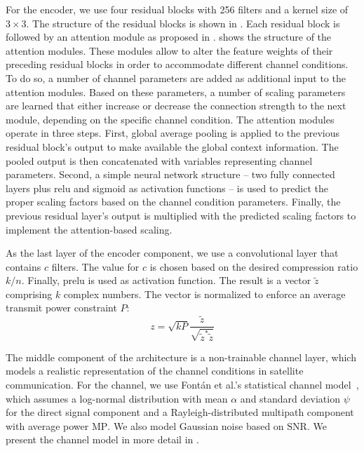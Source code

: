 \documentclass[conference]{IEEEtran}
\newcommand\MP{\ensuremath{\mathrm{MP}}\xspace}
\newcommand\SNR{\ensuremath{\mathrm{SNR}}\xspace}
\begin{document}
For the encoder, we use four residual blocks with 256 filters and a kernel size of $3 \times 3$.
The structure of the residual blocks is shown in .
Each residual block is followed by an attention module as proposed in \cite{wireless-attention-modules}.
 shows the structure of the attention modules.
These modules allow to alter the feature weights of their preceding residual blocks in order to accommodate different channel conditions.
To do so, a number of channel parameters are added as additional input to the attention modules.
Based on these parameters, a number of scaling parameters are learned that either increase or decrease the connection strength to the next module, depending on the specific channel condition.
The attention modules operate in three steps.
First, global average pooling is applied to the previous residual block's output to make available the global context information.
The pooled output is then concatenated with variables representing channel parameters.
Second, a simple neural network structure -- two fully connected layers plus \ac{relu} and sigmoid as activation functions -- is used to predict the proper scaling factors based on the channel condition parameters.
Finally, the previous residual layer's output is multiplied with the predicted scaling factors to implement the attention-based scaling.

As the last layer of the encoder component, we use a convolutional layer that contains $c$ filters.
The value for $c$ is chosen based on the desired compression ratio $k/n$.
Finally, \ac{prelu} is used as activation function.
The result is a vector $\tilde{z}$ comprising $k$ complex numbers.
The vector is normalized to enforce an average transmit power constraint $P$:
%
\begin{equation}
  z = \sqrt{kP}\frac{\tilde{z}}{\sqrt{\tilde{z}^{*} \tilde{z}}}
\end{equation}

The middle component of the architecture is a non-trainable channel layer, which models a realistic representation of the channel conditions in satellite communication.
For the channel, we use Fontán et al.'s statistical channel model~\cite{966585}, which assumes a log-normal distribution with mean $\alpha$ and standard deviation $\psi$ for the direct signal component and a Rayleigh-distributed multipath component with average power \MP. We also model Gaussian noise based on \SNR.
We present the channel model in more detail in .
\end{document}
